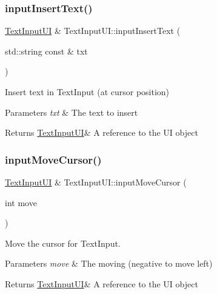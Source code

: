 \subsubsection{\texorpdfstring{input\+Insert\+Text()}{inputInsertText()}}
{\footnotesize\ttfamily \hyperlink{class_text_input_u_i}{Text\+Input\+UI} \& Text\+Input\+U\+I\+::input\+Insert\+Text (\begin{DoxyParamCaption}\item[{std\+::string const \&}]{txt }\end{DoxyParamCaption})}



Insert text in Text\+Input (at cursor position) 


\begin{DoxyParams}{Parameters}
{\em txt} & The text to insert \\
\hline
\end{DoxyParams}
\begin{DoxyReturn}{Returns}
\hyperlink{class_text_input_u_i}{Text\+Input\+UI}\& A reference to the UI object 
\end{DoxyReturn}
\mbox{\label{class_text_input_u_i_a558e6ce9918f6295c7fad84442d9f56d}} 
\subsubsection{\texorpdfstring{input\+Move\+Cursor()}{inputMoveCursor()}}
{\footnotesize\ttfamily \hyperlink{class_text_input_u_i}{Text\+Input\+UI} \& Text\+Input\+U\+I\+::input\+Move\+Cursor (\begin{DoxyParamCaption}\item[{int}]{move }\end{DoxyParamCaption})}



Move the cursor for Text\+Input. 


\begin{DoxyParams}{Parameters}
{\em move} & The moving (negative to move left) \\
\hline
\end{DoxyParams}
\begin{DoxyReturn}{Returns}
\hyperlink{class_text_input_u_i}{Text\+Input\+UI}\& A reference to the UI object 
\end{DoxyReturn}
\mbox{\label{class_text_input_u_i_acd3e059ae54ad2dc237a15f5f5c93596}} 
